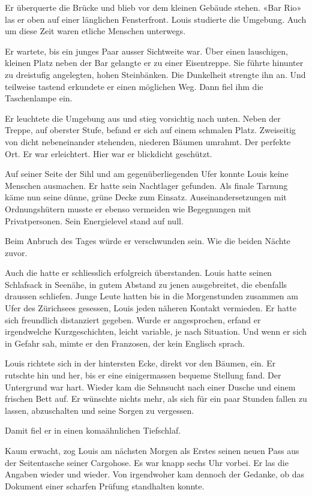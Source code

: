 Er überquerte die Brücke und blieb vor dem kleinen Gebäude stehen. «Bar
Rio» las er oben auf einer länglichen Fensterfront. Louis studierte die
Umgebung. Auch um diese Zeit waren etliche Menschen unterwegs.

Er wartete, bis ein junges Paar ausser Sichtweite war. Über einen
lauschigen, kleinen Platz neben der Bar gelangte er zu einer
Eisentreppe. Sie führte hinunter zu dreistufig angelegten, hohen
Steinbänken. Die Dunkelheit strengte ihn an. Und teilweise tastend
erkundete er einen möglichen Weg. Dann fiel ihm die Taschenlampe ein.

Er leuchtete die Umgebung aus und stieg vorsichtig nach unten. Neben der
Treppe, auf oberster Stufe, befand er sich auf einem schmalen Platz.
Zweiseitig von dicht nebeneinander stehenden, niederen Bäumen umrahmt.
Der perfekte Ort. Er war erleichtert. Hier war er blickdicht geschützt.

Auf seiner Seite der Sihl und am gegenüberliegenden Ufer konnte Louis
keine Menschen ausmachen. Er hatte sein Nachtlager gefunden. Als finale
Tarnung käme nun seine dünne, grüne Decke zum Einsatz.
Auseinandersetzungen mit Ordnungshütern musste er ebenso vermeiden wie
Begegnungen mit Privatpersonen. Sein Energielevel stand auf null.

Beim Anbruch des Tages würde er verschwunden sein. Wie die beiden Nächte
zuvor.

Auch die hatte er schliesslich erfolgreich überstanden. Louis hatte
seinen Schlafsack in Seenähe, in gutem Abstand zu jenen ausgebreitet,
die ebenfalls draussen schliefen. Junge Leute hatten bis in die
Morgenstunden zusammen am Ufer des Zürichsees gesessen, Louis jeden
näheren Kontakt vermieden. Er hatte sich freundlich distanziert gegeben.
Wurde er angesprochen, erfand er irgendwelche Kurzgeschichten, leicht
variable, je nach Situation. Und wenn er sich in Gefahr sah, mimte er
den Franzosen, der kein Englisch sprach.

Louis richtete sich in der hintersten Ecke, direkt vor den Bäumen, ein.
Er rutschte hin und her, bis er eine einigermassen bequeme Stellung
fand. Der Untergrund war hart. Wieder kam die Sehnsucht nach einer
Dusche und einem frischen Bett auf. Er wünschte nichts mehr, als sich
für ein paar Stunden fallen zu lassen, abzuschalten und seine Sorgen zu
vergessen.

Damit fiel er in einen komaähnlichen Tiefschlaf.

Kaum erwacht, zog Louis am nächsten Morgen als Erstes seinen neuen Pass
aus der Seitentasche seiner Cargohose. Es war knapp sechs Uhr vorbei. Er
las die Angaben wieder und wieder. Von irgendwoher kam dennoch der
Gedanke, ob das Dokument einer scharfen Prüfung standhalten konnte.

